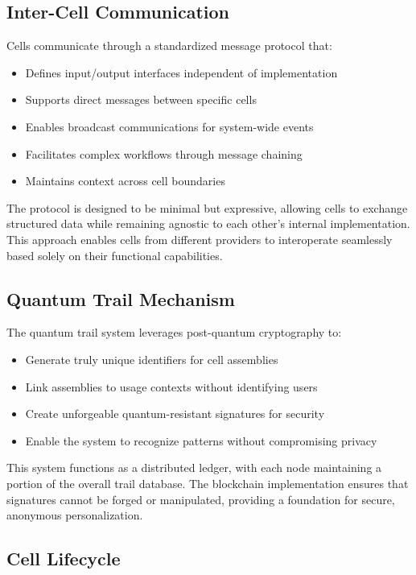 \documentclass[11pt,a4paper]{article}
\begin{document}
\subsection{Inter-Cell Communication}

Cells communicate through a standardized message protocol that:

\begin{itemize}
    \item Defines input/output interfaces independent of implementation
    \item Supports direct messages between specific cells
    \item Enables broadcast communications for system-wide events
    \item Facilitates complex workflows through message chaining
    \item Maintains context across cell boundaries
\end{itemize}

The protocol is designed to be minimal but expressive, allowing cells to exchange structured data while remaining agnostic to each other's internal implementation. This approach enables cells from different providers to interoperate seamlessly based solely on their functional capabilities.

\subsection{Quantum Trail Mechanism}

The quantum trail system leverages post-quantum cryptography to:

\begin{itemize}
    \item Generate truly unique identifiers for cell assemblies
    \item Link assemblies to usage contexts without identifying users
    \item Create unforgeable quantum-resistant signatures for security
    \item Enable the system to recognize patterns without compromising privacy
\end{itemize}

This system functions as a distributed ledger, with each node maintaining a portion of the overall trail database. The blockchain implementation ensures that signatures cannot be forged or manipulated, providing a foundation for secure, anonymous personalization.

\subsection{Cell Lifecycle}
\end{document}
